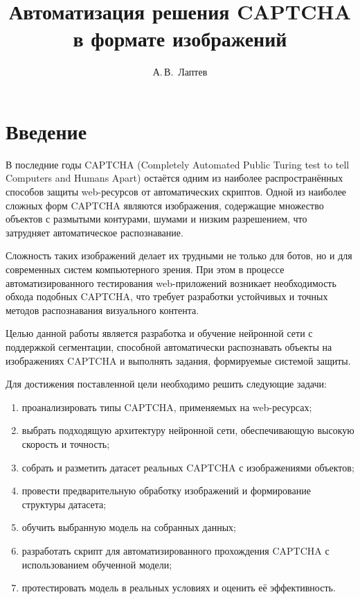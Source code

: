 \documentclass{altsu-report}
\title{Автоматизация решения CAPTCHA в формате изображений}
\author{А.\,В.~Лаптев}
\institute{Институт цифровых технологий, электроники и физики}
\date{\the\year}
\begin{document}
\maketitle

\setcounter{page}{2}
\makeabstract
\tableofcontents

\chapter*{Введение}

В последние годы CAPTCHA (Completely Automated Public Turing test to tell Computers and Humans Apart) остаётся одним из наиболее распространённых способов защиты web-ресурсов от автоматических скриптов. Одной из наиболее сложных форм CAPTCHA являются изображения, содержащие множество объектов с размытыми контурами, шумами и низким разрешением, что затрудняет автоматическое распознавание.

Сложность таких изображений делает их трудными не только для ботов, но и для современных систем компьютерного зрения. При этом в процессе автоматизированного тестирования web-приложений возникает необходимость обхода подобных CAPTCHA, что требует разработки устойчивых и точных методов распознавания визуального контента.

Целью данной работы является разработка и обучение нейронной сети с поддержкой сегментации, способной автоматически распознавать объекты на изображениях CAPTCHA и выполнять задания, формируемые системой защиты.  

Для достижения поставленной цели необходимо решить следующие задачи:
\begin{enumerate}
    \item проанализировать типы CAPTCHA, применяемых на web-ресурсах;
    \item выбрать подходящую архитектуру нейронной сети, обеспечивающую высокую скорость и точность;
    \item собрать и разметить датасет реальных CAPTCHA с изображениями объектов;
    \item провести предварительную обработку изображений и формирование структуры датасета;
    \item обучить выбранную модель на собранных данных;
    \item разработать скрипт для автоматизированного прохождения CAPTCHA с использованием обученной модели;
    \item протестировать модель в реальных условиях и оценить её эффективность.
\end{enumerate}
\end{document}
